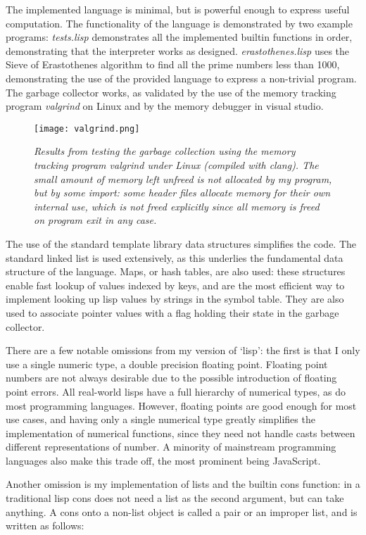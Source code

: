 \documentclass[12pt]{article}
\begin{document}
The implemented language is minimal, but is powerful enough to express
useful computation. The functionality of the language is demonstrated
by two example programs: \textit{tests.lisp} demonstrates all the
implemented builtin functions in order, demonstrating that the
interpreter works as designed. \textit{erastothenes.lisp} uses the
Sieve of Erastothenes algorithm to find all the prime numbers less
than 1000, demonstrating the use of the provided language to express a
non-trivial program. The garbage collector works, as validated by the
use of the memory tracking program \textit{valgrind} on Linux and by
the memory debugger in visual studio.


\begin{figure}
  \centering
  \texttt{[image: valgrind.png]}
  \caption{\textit{
  Results from testing the garbage collection using the memory tracking
  program valgrind under Linux (compiled with clang). The small amount 
  of memory left unfreed is not allocated by my program, but by some import:
  some header files allocate memory for their own internal use, which is 
  not freed explicitly since all memory is freed on program exit in any case.
  }}
\end{figure}


The use of the standard template library data structures simplifies
the code. The standard linked list is used extensively, as this
underlies the fundamental data structure of the language. Maps, or
hash tables, are also used: these structures enable fast lookup of
values indexed by keys, and are the most efficient way to implement
looking up lisp values by strings in the symbol table. They are also
used to associate pointer values with a flag holding their state in
the garbage collector.

There are a few notable omissions from my version of `lisp': the first
is that I only use a single numeric type, a double precision floating
point. Floating point numbers are not always desirable due to the
possible introduction of floating point errors. All real-world lisps
have a full hierarchy of numerical types, as do most programming
languages. However, floating points are good enough for most use
cases, and having only a single numerical type greatly simplifies the
implementation of numerical functions, since they need not handle
casts between different representations of number. A minority of
mainstream programming languages also make this trade off, the most
prominent being JavaScript.

Another omission is my implementation of lists and the builtin cons
function: in a traditional lisp cons does not need a list as the
second argument, but can take anything. A cons onto a non-list object
is called a pair or an improper list, and is written as follows:
\end{document}
